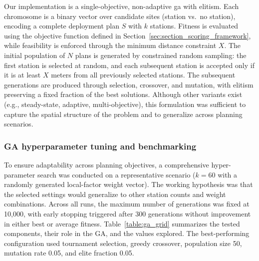     Our implementation is a single-objective, non-adaptive \ac{ga} with elitism. Each chromosome is a binary vector over candidate sites (station vs.\ no station), encoding a complete deployment plan $S$ with $k$ stations. Fitness is evaluated using the objective function defined in Section~\ref{sec:section_scoring_framework}, while feasibility is enforced through the minimum distance constraint \(X\). The initial population of $N$ plans is generated by constrained random sampling: the first station is selected at random, and each subsequent station is accepted only if it is at least $X$ meters from all previously selected stations. The subsequent generations are produced through selection, crossover, and mutation, with elitism preserving a fixed fraction of the best solutions. Although other variants exist (e.g., steady-state, adaptive, multi-objective), this formulation was sufficient to capture the spatial structure of the problem and to generalize across planning scenarios.


    \subsubsection{GA hyperparameter tuning and benchmarking}

To ensure adaptability across planning objectives, a comprehensive hyper-parameter search was conducted on a representative scenario (\(k=60\) with a randomly generated local-factor weight vector). The working hypothesis was that the selected settings would generalize to other station counts and weight combinations. Across all runs, the maximum number of generations was fixed at 10,000, with early stopping triggered after 300 generations without improvement in either best or average fitness. Table~\ref{table:ga_grid} summarizes the tested components, their role in the GA, and the values explored. The best-performing configuration used tournament selection, greedy crossover, population size 50, mutation rate 0.05, and elite fraction 0.05.

